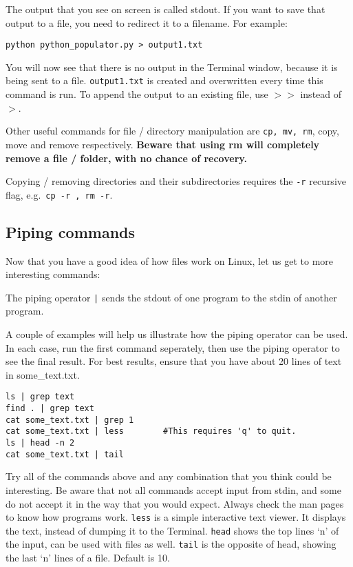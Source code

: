 \documentclass[a4paper]{article}
\begin{document}
The output that you see on screen is called stdout. If you want to save that output to a file, you need to redirect it to a filename. For example: 
\begin{lstlisting}
python python_populator.py > output1.txt
\end{lstlisting}

You will now see that there is no output in the Terminal window, because it is being sent to a file. \texttt{output1.txt} is created and overwritten every time this command is run. To append the output to an existing file, use $>>$ instead of $>$. 

Other useful commands for file / directory manipulation are
\texttt{cp, mv, rm}, copy, move and remove respectively. \textbf{Beware that using rm will completely remove a file / folder, with no chance of recovery.}

Copying / removing directories and their subdirectories requires the \texttt{-r} recursive flag, e.g.\ \texttt{cp -r , rm -r}.



\subsection{Piping commands}

Now that you have a good idea of how files work on Linux, let us get to more interesting commands: 

The piping operator \texttt{|} sends the stdout of one program to the stdin of another program. 

A couple of examples will help us illustrate how the piping operator can be used. In each case, run the first command seperately, then use the piping operator to see the final result. For best results, ensure that you have about 20 lines of text in some\_text.txt. 

\begin{lstlisting}
ls | grep text
find . | grep text
cat some_text.txt | grep 1
cat some_text.txt | less		#This requires 'q' to quit.
ls | head -n 2
cat some_text.txt | tail
\end{lstlisting}
Try all of the commands above and any combination that you think could be interesting. Be aware that not all commands accept input from stdin, and some do not accept it in the way that you would expect. Always check the man pages to know how programs work. 
\texttt{less} is a simple interactive text viewer. It displays the text, instead of dumping it to the Terminal. 
\texttt{head} shows the top lines `n' of the input, can be used with files as well. 
\texttt{tail} is the opposite of head, showing the last `n' lines of a file. Default is 10. 
\end{document}
